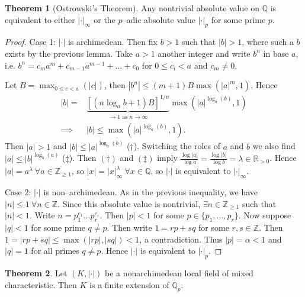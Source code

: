 \documentclass{article}
\theoremstyle{definition}
\newtheorem{theorem}{Theorem}[section]
\begin{document}
\begin{theorem}[Ostrowski's Theorem]\label{theorem7.6}
    Any nontrivial absolute value on $\mathbb{Q}$ is equivalent to either $|\cdot|_{\infty}$ or the $p$--adic absolute value $|\cdot|_{p}$ for some prime $p$.
\end{theorem}
\begin{proof}
    Case 1: $|\cdot|$ is archimedean. Then fix $b>1$ such that $|b|>1$, where such a $b$ exists by the previous lemma. Take $a>1$ another integer and write $b^n$ in base $a$, i.e. $b^n = c_ma^m + c_{m-1}a^{m-1} + \ldots + c_0$ for $0\le c_i<a$ and $c_m \neq 0$. 
    \vspace{1mm}
     
    Let $B = \max_{0\le c<a}(|c|)$, then $|b^n| \le (m+1)B \max(|a|^m,1)$. Hence 
    \begin{align*}
        |b| =& \underbrace{\left[(n \log_{a}b+1)B\right]^{1/n}}_{\to 1 \text{ as }n \to \infty}\max(|a|^{\log_a(b)},1) \\
        \implies & |b|\le \max(|a|^{\log_a(b)},1).
    \end{align*}
    Then $|a|>1$ and $|b|\le |a|^{\log_a(b)}$ ($\dagger$). Switching the roles of $a$ and $b$ we also find $|a|\le |b|^{\log_b(a)}$ ($\ddagger$). Then $(\dagger)$ and $(\ddagger)$ imply $\frac{\log|a|}{\log a} = \frac{\log |b|}{\log b} = \lambda \in \mathbb{R}_{> 0}$. Hence $|a| = a^{\lambda} ~\forall a \in \mathbb{Z}_{\ge 1}$, so $|x|=|x|_{\infty}^{\lambda}~\forall x \in \mathbb{Q}$, so $|\cdot|$ is equivalent to $|\cdot|_{\infty}$.
    \vspace{1mm}
     
    Case 2: $|\cdot|$ is non--archimedean. As in the previous inequality, we have $|n|\le 1 ~\forall n \in \mathbb{Z}$. Since this absolute value is nontrivial, $\exists n \in \mathbb{Z}_{\ge 1}$ such that $|n|<1$. Write $n = p_1^{e_1}\ldots p_r^{e_r}$. Then $|p|<1$ for some $p \in \{p_1,\ldots,p_r\}$. Now suppose $|q|<1$ for some prime $q \neq p$. Then write $1 = rp+sq$ for some $r,s \in \mathbb{Z}$. Then $1 = |rp+sq|\le \max(|rp|, |sq|) < 1$, a contradiction. Thus $|p| = \alpha<1$ and $|q| = 1$ for all primes $q \neq p$. Hence $|\cdot|$ is equivalent to $|\cdot|_p$.
\end{proof}
\begin{theorem}
    Let $(K,|\cdot|)$ be a nonarchimedean local field of mixed characteristic. Then $K$ is a finite extension of $\mathbb{Q}_p$.
\end{theorem}
\end{document}
